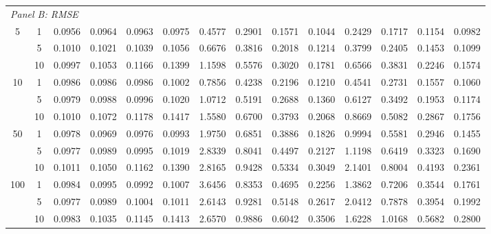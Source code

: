 \documentclass[12pt]{article}
\numberwithin{equation}{section}
\begin{document}
\begin{table}[ht]
{\begin{tabular}{cc|cccc|cccc|cccc}
\hline
\multicolumn{14}{l}{\textit{Panel B: RMSE}}\\
5   & 1  & 0.0956 & 0.0964 & 0.0963 & 0.0975 & 0.4577 & 0.2901 & 0.1571 & 0.1044 & 0.2429 & 0.1717 & 0.1154 & 0.0982 \\
    & 5  & 0.1010 & 0.1021 & 0.1039 & 0.1056 & 0.6676 & 0.3816 & 0.2018 & 0.1214 & 0.3799 & 0.2405 & 0.1453 & 0.1099 \\
    & 10 & 0.0997 & 0.1053 & 0.1166 & 0.1399 & 1.1598 & 0.5576 & 0.3020 & 0.1781 & 0.6566 & 0.3831 & 0.2246 & 0.1574 \\
10  & 1  & 0.0986 & 0.0986 & 0.0986 & 0.1002 & 0.7856 & 0.4238 & 0.2196 & 0.1210 & 0.4541 & 0.2731 & 0.1557 & 0.1060 \\
    & 5  & 0.0979 & 0.0988 & 0.0996 & 0.1020 & 1.0712 & 0.5191 & 0.2688 & 0.1360 & 0.6127 & 0.3492 & 0.1953 & 0.1174 \\
    & 10 & 0.1010 & 0.1072 & 0.1178 & 0.1417 & 1.5580 & 0.6700 & 0.3793 & 0.2068 & 0.8669 & 0.5082 & 0.2867 & 0.1756 \\
50  & 1  & 0.0978 & 0.0969 & 0.0976 & 0.0993 & 1.9750 & 0.6851 & 0.3886 & 0.1826 & 0.9994 & 0.5581 & 0.2946 & 0.1455 \\
    & 5  & 0.0977 & 0.0989 & 0.0995 & 0.1019 & 2.8339 & 0.8041 & 0.4497 & 0.2127 & 1.1198 & 0.6419 & 0.3323 & 0.1690 \\
    & 10 & 0.1011 & 0.1050 & 0.1162 & 0.1390 & 2.8165 & 0.9428 & 0.5334 & 0.3049 & 2.1401 & 0.8004 & 0.4193 & 0.2361 \\
100 & 1  & 0.0984 & 0.0995 & 0.0992 & 0.1007 & 3.6456 & 0.8353 & 0.4695 & 0.2256 & 1.3862 & 0.7206 & 0.3544 & 0.1761 \\
    & 5  & 0.0977 & 0.0989 & 0.1004 & 0.1011 & 2.6143 & 0.9281 & 0.5148 & 0.2617 & 2.0412 & 0.7878 & 0.3954 & 0.1992 \\
    & 10 & 0.0983 & 0.1035 & 0.1145 & 0.1413 & 2.6570 & 0.9886 & 0.6042 & 0.3506 & 1.6228 & 1.0168 & 0.5682 & 0.2800 \\
\hline
\end{tabular}}
\label{tab:VARMA_bias_RMSE_500}
\end{table}
\end{document}
